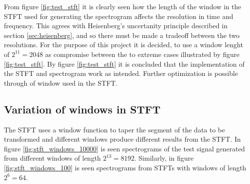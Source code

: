 From figure \ref{fig:test_stft} it is clearly seen how the length of the window in the STFT used for generating the spectrogram affects the resolution in time and frequency. This agrees with Heisenberg's uncertanity principle described in section \ref{sec:heisenberg}, and so there must be made a tradeoff between the two resolutions. For the purpose of this project it is decided, to use a window lenght of $2^{11}=2048$ as compromise between the to extreme cases illustrated by figure \ref{fig:test_stft}.  By figure \ref{fig:test_stft} it is concluded that the implementation of the STFT and spectrogram work as intended. Further optimization is possible through of window used in the STFT. 

\subsection{Variation of windows in STFT}
The STFT uses a window function to taper the segment of the data to be transformed and different windows produce different results from the STFT. In figure \ref{fig:stft_windows_10000} is seen spectrograms of the test signal generated from different windows of length $2^{13}=8192$. Similarly, in figure \ref{fig:stft_windows_100} is seen spectrograms from STFTs with windows of length $2^6=64$.
